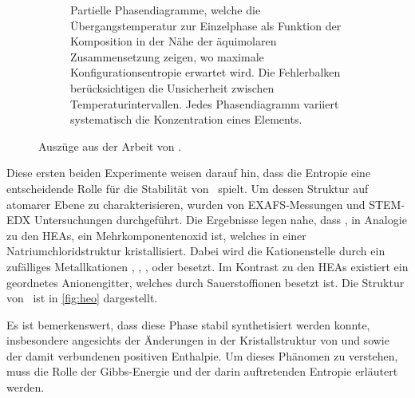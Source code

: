\begin{figure}
\begin{subfigure}{0.6\textwidth}
        \caption{Partielle Phasendiagramme, welche die Übergangstemperatur zur Einzelphase als Funktion der Komposition
        in der Nähe der äquimolaren Zusammensetzung zeigen, wo maximale Konfigurationsentropie erwartet wird.
        Die Fehlerbalken berücksichtigen die Unsicherheit zwischen Temperaturintervallen. Jedes Phasendiagramm variiert
        systematisch die Konzentration eines Elements.}
        \label{fig:rost2}
        \vspace*{10mm}
    \end{subfigure}
    \caption{Auszüge aus der Arbeit von  \autocite{Rost2015}.}
\end{figure}
\captionsetup{justification=centering}

Diese ersten beiden Experimente weisen darauf hin, dass die Entropie eine entscheidende Rolle für die Stabilität von
\heo\ spielt.
Um dessen Struktur auf atomarer Ebene zu charakterisieren, wurden von  EXAFS-Messungen
und STEM-EDX Untersuchungen durchgeführt.
Die Ergebnisse legen nahe, dass \heo, in Analogie zu den HEAs, ein Mehrkomponentenoxid ist, welches in einer
Natriumchloridstruktur kristallisiert.
Dabei wird die Kationenstelle durch ein zufälliges Metallkationen , , ,
 oder  besetzt.
Im Kontrast zu den HEAs existiert ein geordnetes Anionengitter, welches durch Sauerstoffionen besetzt ist.
Die Struktur von \heo\ ist in \cref{fig:heo} dargestellt.

Es ist bemerkenswert, dass diese Phase stabil synthetisiert werden konnte, insbesondere angesichts der Änderungen in der
Kristallstruktur von  und  sowie der damit verbundenen positiven Enthalpie.
Um dieses Phänomen zu verstehen, muss die Rolle der Gibbs-Energie und der darin auftretenden Entropie
erläutert werden.

